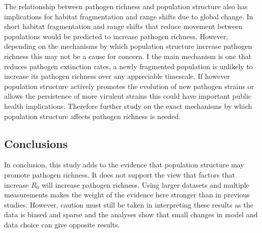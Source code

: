 The relationship between pathogen richness and population structure also has implications for habitat fragmentation and range shifts due to global change.
In short habitat fragmentation and range shifts that reduce movement between populations would be predicted to increase pathogen richness.
However, depending on the mechanisms by which population structure increase pathogen richness this may not be a cause for concern.
I the main mechanism is one that reduces pathogen extinction rates, a newly fragmented population is unlikely to increase its pathogen richness over any appreciable timescale.
If however population structure actively promotes the evolution of new pathogen strains or allows the persistence of more virulent strains this could have important public health implications.
Therefore further study on the exact mechanisms by which population structure affects pathogen richness is needed. 

\subsection{Conclusions}

In conclusion, this study adds to the evidence that population structure may promote pathogen richness.
It does not support the view that factors that increase $R_0$ will increase pathogen richness.
Using larger datasets and multiple measurements makes the weight of the evidence here stronger than in previous studies.
However, caution must still be taken in interpreting these results as the data is biased and sparse and the analyses show that small changes in model and data choice can give opposite results.






















